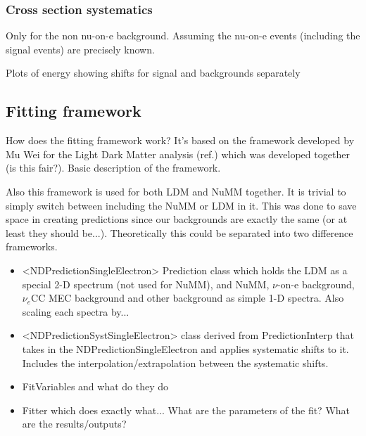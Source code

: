 \subsubsection*{Cross section systematics}
Only for the non nu-on-e background. Assuming the nu-on-e events (including the signal events) are precisely known.

Plots of energy showing shifts for signal and backgrounds separately

\subsection{Fitting framework}
How does the fitting framework work? It's based on the framework developed by Mu Wei for the Light Dark Matter analysis (ref.) which was developed together (is this fair?). Basic description of the framework.

Also this framework is used for both LDM and NuMM together. It is trivial to simply switch between including the NuMM or LDM in it. This was done to save space in creating predictions since our backgrounds are exactly the same (or at least they should be...). Theoretically this could be separated into two difference frameworks.

\begin{itemize}
\item <NDPredictionSingleElectron> Prediction class which holds the LDM as a special 2-D spectrum (not used for NuMM), and NuMM, $\nu$-on-e background, $\nu_e$CC MEC background and other background as simple 1-D spectra. Also scaling each spectra by...
\item <NDPredictionSystSingleElectron> class derived from PredictionInterp that takes in the NDPredictionSingleElectron and applies systematic shifts to it. Includes the interpolation/extrapolation between the systematic shifts.
\item FitVariables and what do they do
\item Fitter which does exactly what... What are the parameters of the fit? What are the results/outputs?
\end{itemize}
